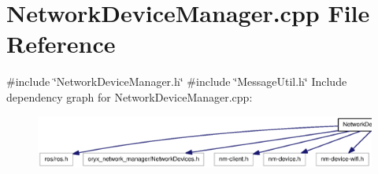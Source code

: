 \section{\-Network\-Device\-Manager.\-cpp \-File \-Reference}
\label{NetworkDeviceManager_8cpp}
{\ttfamily \#include \char`\"{}\-Network\-Device\-Manager.\-h\char`\"{}}\*
{\ttfamily \#include \char`\"{}\-Message\-Util.\-h\char`\"{}}\*
\-Include dependency graph for \-Network\-Device\-Manager.\-cpp\-:
\nopagebreak
\begin{figure}[H]
\begin{center}
\leavevmode
\includegraphics[width=350pt]{NetworkDeviceManager_8cpp__incl}
\end{center}
\end{figure}
